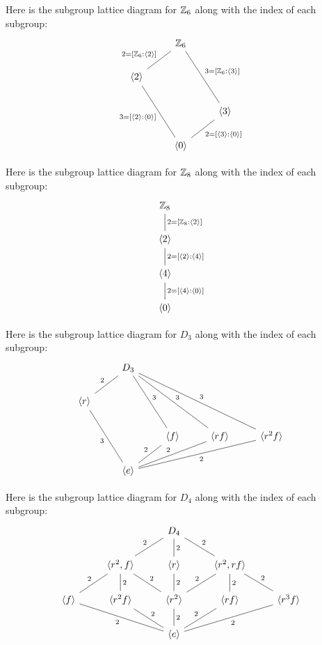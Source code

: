 \documentclass{ximera}
\begin{document}
\begin{example}
   Here is the subgroup lattice diagram for $\mathbb Z_6$ along with the
   index of each subgroup:   
  \[
  \begin{tikzcd}
    & \Z_6 \ar[ld,-,"{2=[\Z_6:\<2\>]}",swap]  \ar[rdd,-,"{3=[\Z_6:\<3\>]}"] &       \\
    \<2\> \ar[rdd,-,"{3=[\<2\>:\<0\>]}",swap] &  &\\
   & &  \< 3\> \ar[ld,-,"{2=[\<3\>:\<0\>]}"]        \\   
    & \<0\> &
  \end{tikzcd}
  \]
\end{example}



\begin{example}
   Here is the subgroup lattice diagram for $\mathbb Z_8$ along with the
   index of each subgroup:   
   \[
   \begin{tikzcd}
     \Z_8  \ar[d,-,"{2 = [\Z_8:\<2\>]}"] \\
     \<2\> \ar[d,-,"{2 = [\<2\>:\<4\>]}"] \\
     \<4\> \ar[d,-,"{2 = [\<4\>:\<0\>]}"] \\   
     \<0\> 
\end{tikzcd}
\]
\end{example}


\begin{example}
  Here is the subgroup lattice diagram for $D_3$ along with the
   index of each subgroup:   
  \[
  \begin{tikzcd}
    & D_3 \ar[rdd,-,"3"]\ar[rrdd,-,"3"]\ar[rrrdd,-,"3"]  \ar[ld,-,"2",swap] & & &      \\
    \<r\> \ar[rdd,-,"3",swap]       &       &  & &  \\
    &       &  \< f\> \ar[ld,-,"2",swap]   &  \< rf\> \ar[lld,-,"2",swap]       &  \< r^2f\> \ar[llld,-,"2"]        \\   
    & \<e\> & & &
  \end{tikzcd}
  \]
\end{example}


\begin{example}
  Here is the subgroup lattice diagram for $D_4$ along with the index
  of each subgroup:
  \[
\begin{tikzcd}
   &    & D_4 \ar[rd,-,"2"] \ar[d,-,"2"] \ar[ld,-,"2",swap] &       \\
&\<r^2,f\>  \ar[rd,-,"2"] \ar[d,-,"2"] \ar[ld,-,"2",swap]& \<r \>  \ar[d,-,"2"]     & \<r^2,rf\> \ar[ld,-,"2",swap] \ar[d,-,"2"] \ar[rd,-,"2"]\\
\<f\>\ar[rrd,-,"2",swap]& \<r^2f\> \ar[rd,-,"2"]&\< r^2\> \ar[d,-,"2"]  &   \<rf\> \ar[ld,-,"2",swap]& \<r^3f\>\ar[lld,-,"2"]     \\   
  &     & \<e\> &  &
\end{tikzcd}
\]
\end{example}
\end{document}
